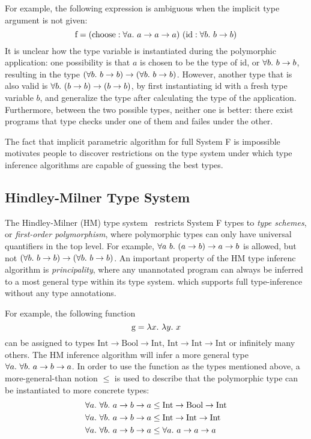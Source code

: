 For example, the following expression is ambiguous
when the implicit type argument is not given:
$$\text{f} = (\text{choose} : \all a \to a \to a)~(\text{id} : \all[b] b \to b)$$
It is unclear how the type variable is instantiated during the polymorphic application:
one possibility is that $a$ is chosen to be the type of $\text{id}$, or $\all[b] b \to b$,
resulting in the type $(\all[b] b \to b) \to (\all[b] b \to b)$.
However, another type that is also valid is $\all[b] (b \to b) \to (b \to b)$,
by first instantiating $\text{id}$ with a fresh type variable $b$,
and generalize the type after calculating the type of the application.
Furthermore, between the two possible types, neither one is better:
there exist programs that type checks under one of them and failes under the other.

The fact that implicit parametric algorithm for full System F is impossible
motivates people to discover restrictions on the type system
under which type inference algorithms are capable of guessing the best types.


\subsection{Hindley-Milner Type System}

The Hindley-Milner (HM) type system~\citep{hindley1969principal,milner1978theory,damas1982principal} restricts System F types to \emph{type schemes},
or \emph{first-order polymorphism},
where polymorphic types can only have universal quantifiers in the top level.
For example, $\all[a~b] (a \to b) \to a \to b$ is allowed,
but not $(\all[b] b \to b) \to (\all[b] b \to b)$.
An important property of the HM type inferenc algorithm is \emph{principality},
where any unannotated program can always be inferred to a most general type within its type system.
which supports full type-inference without any type annotations.

For example, the following function
$$\text{g} = \lam[x]{\lam[y] x}$$
can be assigned to types $\text{Int} \to \text{Bool} \to \text{Int}$,
$\text{Int} \to \text{Int} \to \text{Int}$ or infinitely many others.
The HM inference algorithm will infer a more general type $\all[a]{\all[b] a \to b \to a}$.
In order to use the function as the types mentioned above,
a more-general-than notion $\le$ is used to describe that
the polymorphic type can be instantiated to more concrete types:
$$\begin{aligned}
  \all[a]{\all[b] a \to b \to a} &\le \text{Int} \to \text{Bool} \to \text{Int}\\
  \all[a]{\all[b] a \to b \to a} &\le \text{Int} \to \text{Int} \to \text{Int}\\
  \all[a]{\all[b] a \to b \to a} &\le \all a \to a \to a\\
\end{aligned}$$

